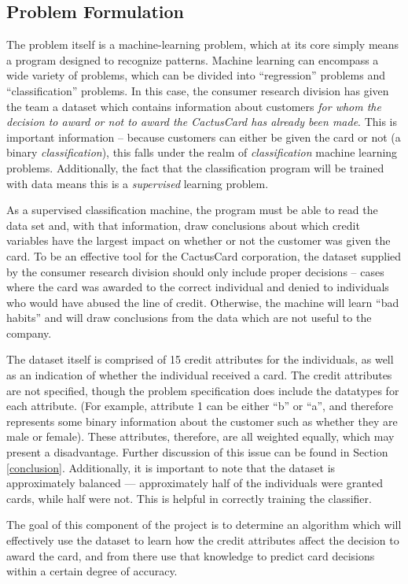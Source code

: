 \documentclass[11pt,journal]{IEEEtran}
\begin{document}
\subsection{Problem Formulation}
The problem itself is a machine-learning problem, which at its core simply means a program designed to recognize patterns. Machine learning can encompass a wide variety of problems, which can be divided into ``regression'' problems and ``classification'' problems. In this case, the consumer research division has given the team a dataset which contains information about customers \emph{for whom the decision to award or not to award the CactusCard has already been made}. This is important information -- because customers can either be given the card or not (a binary \emph{classification}), this falls under the realm of \emph{classification} machine learning problems. Additionally, the fact that the classification program will be trained with data means this is a \emph{supervised} learning problem.
\par
As a supervised classification machine, the program must be able to read the data set and, with that information, draw conclusions about which credit variables have the largest impact on whether or not the customer was given the card. To be an effective tool for the CactusCard corporation, the dataset supplied by the consumer research division should only include proper decisions -- cases where the card was awarded to the correct individual and denied to individuals who would have abused the line of credit. Otherwise, the machine will learn ``bad habits'' and will draw conclusions from the data which are not useful to the company.
\par
The dataset itself is comprised of 15 credit attributes for the individuals, as well as an indication of whether the individual received a card. The credit attributes are not specified, though the problem specification does include the datatypes for each attribute. (For example, attribute 1 can be either ``b'' or ``a'', and therefore represents some binary information about the customer such as whether they are male or female). These attributes, therefore, are all weighted equally, which may present a disadvantage. Further discussion of this issue can be found in Section \ref{conclusion}. Additionally, it is important to note that the dataset is approximately balanced --- approximately half of the individuals were granted cards, while half were not. This is helpful in correctly training the classifier.
\par
The goal of this component of the project is to determine an algorithm which will effectively use the dataset to learn how the credit attributes affect the decision to award the card, and from there use that knowledge to predict card decisions within a certain degree of accuracy.
\end{document}
